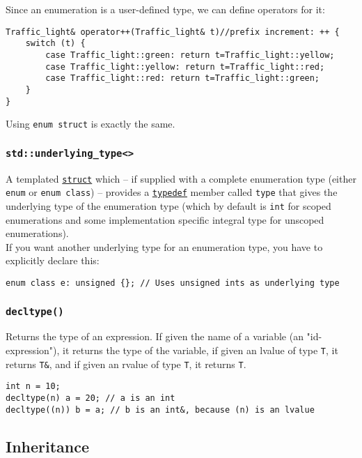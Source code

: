 \documentclass[8pt, table, xcdraw]{article}%
\begin{document}
Since an enumeration is a user-defined type, we can define operators for it:

\begin{lstlisting}
Traffic_light& operator++(Traffic_light& t)//prefix increment: ++ {
    switch (t) {
        case Traffic_light::green: return t=Traffic_light::yellow;
        case Traffic_light::yellow: return t=Traffic_light::red;
        case Traffic_light::red: return t=Traffic_light::green;
    }
}
\end{lstlisting}

Using \lstinline{enum struct} is exactly the same.

\subsubsection{\lstinline{std::underlying_type<>}}

A templated \hyperref[struct]{\lstinline{struct}} which -- if supplied with a complete enumeration type (either \lstinline{enum} or \lstinline{enum class}) -- provides a \hyperref[typedef]{\lstinline{typedef}} member called \lstinline{type} that gives the underlying type of the enumeration type (which by default is \lstinline{int} for scoped enumerations and some implementation specific integral type for unscoped enumerations).\\
If you want another underlying type for an enumeration type, you have to explicitly declare this:

\begin{lstlisting}
enum class e: unsigned {}; // Uses unsigned ints as underlying type
\end{lstlisting}

\subsubsection{\lstinline{decltype()}}

Returns the type of an expression. If given the name of a variable (an "id-expression"), it returns the type of the variable, if given an lvalue of type \lstinline{T}, it returns \lstinline{T&}, and if given an rvalue of type \lstinline{T}, it returns \lstinline{T}.

\begin{lstlisting}
int n = 10;
decltype(n) a = 20; // a is an int
decltype((n)) b = a; // b is an int&, because (n) is an lvalue
\end{lstlisting}

\subsection{Inheritance}
\end{document}
